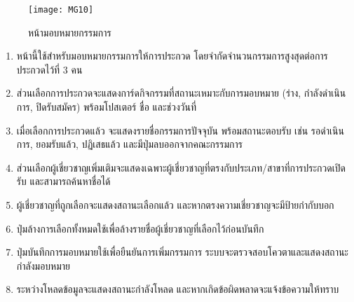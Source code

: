 \vspace{\baselineskip}

\begin{figure}[h]
	\centering
	\texttt{[image: MG10]}
	\caption{หน้ามอบหมายกรรมการ}
\end{figure}

\par

\begin{sloppypar}
	\begin{enumerate}
		\item หน้านี้ใช้สำหรับมอบหมายกรรมการให้การประกวด โดยจำกัดจำนวนกรรมการสูงสุดต่อการประกวดไว้ที่ 3 คน
		\item ส่วนเลือกการประกวดจะแสดงการ์ดกิจกรรมที่สถานะเหมาะกับการมอบหมาย (ร่าง, กำลังดำเนินการ, ปิดรับสมัคร) พร้อมโปสเตอร์ ชื่อ และช่วงวันที่
		\item เมื่อเลือกการประกวดแล้ว จะแสดงรายชื่อกรรมการปัจจุบัน พร้อมสถานะตอบรับ เช่น รอดำเนินการ, ยอมรับแล้ว, ปฏิเสธแล้ว และมีปุ่มลบออกจากคณะกรรมการ
		\item ส่วนเลือกผู้เชี่ยวชาญเพิ่มเติมจะแสดงเฉพาะผู้เชี่ยวชาญที่ตรงกับประเภท/สาขาที่การประกวดเปิดรับ และสามารถค้นหาชื่อได้
		\item ผู้เชี่ยวชาญที่ถูกเลือกจะแสดงสถานะเลือกแล้ว และหากตรงความเชี่ยวชาญจะมีป้ายกำกับบอก
		\item ปุ่มล้างการเลือกทั้งหมดใช้เพื่อล้างรายชื่อผู้เชี่ยวชาญที่เลือกไว้ก่อนบันทึก
		\item ปุ่มบันทึกการมอบหมายใช้เพื่อยืนยันการเพิ่มกรรมการ ระบบจะตรวจสอบโควตาและแสดงสถานะกำลังมอบหมาย
		\item ระหว่างโหลดข้อมูลจะแสดงสถานะกำลังโหลด และหากเกิดข้อผิดพลาดจะแจ้งข้อความให้ทราบ
	\end{enumerate}
\end{sloppypar}

\par


